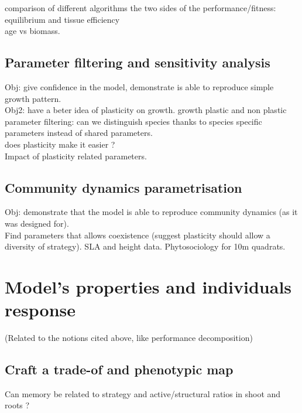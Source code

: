 \documentclass[english,10pt]{article}
\makeatletter
\renewcommand\paragraph{
\@startsection{paragraph}{4}{\z@}
{-1.25ex\@plus -1ex \@minus -.2ex}
{1ex \@plus .2ex}
{\normalfont\normalsize\bfseries}}
\makeatother
\begin{document}
\paragraph{comparison of different algorithms}
the two sides of the performance/fitness: equilibrium and tissue efficiency\\
age vs biomass.

\subsection{Parameter filtering and sensitivity analysis}
Obj: give confidence in the model, demonstrate is able to reproduce simple growth pattern.\\
Obj2: have a beter idea of plasticity on growth.
growth plastic and non plastic parameter filtering: can we distinguish species thanks to species specific parameters instead of shared parameters.\\
does plasticity make it easier ?\\
Impact of plasticity related parameters.

\subsection{Community dynamics parametrisation}
Obj: demonstrate that the model is able to reproduce community dynamics (as it was designed for).\\
Find parameters that allows coexistence (suggest plasticity should allow a diversity of strategy). SLA and height data. Phytosociology for 10m quadrats.

\section{Model's properties and individuals response}
(Related to the notions cited above, like performance decomposition)

\subsection{Craft a trade-of and phenotypic map}
Can memory be related to strategy and active/structural ratios in shoot and roots ?
\end{document}
